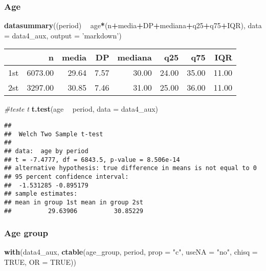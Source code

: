 \documentclass[
]{article}
\newenvironment{Shaded}{\begin{snugshade}}{\end{snugshade}}
\newcommand{\CommentTok}[1]{\textcolor[rgb]{0.56,0.35,0.01}{\textit{#1}}}
\newcommand{\DataTypeTok}[1]{\textcolor[rgb]{0.13,0.29,0.53}{#1}}
\newcommand{\KeywordTok}[1]{\textcolor[rgb]{0.13,0.29,0.53}{\textbf{#1}}}
\newcommand{\NormalTok}[1]{#1}
\newcommand{\OperatorTok}[1]{\textcolor[rgb]{0.81,0.36,0.00}{\textbf{#1}}}
\newcommand{\OtherTok}[1]{\textcolor[rgb]{0.56,0.35,0.01}{#1}}
\newcommand{\StringTok}[1]{\textcolor[rgb]{0.31,0.60,0.02}{#1}}
\begin{document}
\hypertarget{age-2}{%
\subsubsection{Age}\label{age-2}}

\begin{Shaded}
\begin{Highlighting}[]
\KeywordTok{datasummary}\NormalTok{((period) }\OperatorTok{~}\StringTok{ }\NormalTok{age}\OperatorTok{*}\NormalTok{(n}\OperatorTok{+}\NormalTok{media}\OperatorTok{+}\NormalTok{DP}\OperatorTok{+}\NormalTok{mediana}\OperatorTok{+}\NormalTok{q25}\OperatorTok{+}\NormalTok{q75}\OperatorTok{+}\NormalTok{IQR),}
            \DataTypeTok{data =}\NormalTok{ data4_aux, }\DataTypeTok{output =} \StringTok{'markdown'}\NormalTok{)}
\end{Highlighting}
\end{Shaded}

\begin{longtable}[]{@{}lrrrrrrr@{}}
\toprule
& n & media & DP & mediana & q25 & q75 & IQR\tabularnewline
\midrule
\endhead
1st & 6073.00 & 29.64 & 7.57 & 30.00 & 24.00 & 35.00 &
11.00\tabularnewline
2st & 3297.00 & 30.85 & 7.46 & 31.00 & 25.00 & 36.00 &
11.00\tabularnewline
\bottomrule
\end{longtable}

\begin{Shaded}
\begin{Highlighting}[]
\CommentTok{#teste t}
\KeywordTok{t.test}\NormalTok{(age }\OperatorTok{~}\StringTok{ }\NormalTok{period, }\DataTypeTok{data =}\NormalTok{ data4_aux)}
\end{Highlighting}
\end{Shaded}

\begin{verbatim}
## 
##  Welch Two Sample t-test
## 
## data:  age by period
## t = -7.4777, df = 6843.5, p-value = 8.506e-14
## alternative hypothesis: true difference in means is not equal to 0
## 95 percent confidence interval:
##  -1.531285 -0.895179
## sample estimates:
## mean in group 1st mean in group 2st 
##          29.63906          30.85229
\end{verbatim}

\hypertarget{age-group-2}{%
\subsubsection{Age group}\label{age-group-2}}

\begin{Shaded}
\begin{Highlighting}[]
\KeywordTok{with}\NormalTok{(data4_aux, }\KeywordTok{ctable}\NormalTok{(age_group, period, }\DataTypeTok{prop =} \StringTok{"c"}\NormalTok{, }\DataTypeTok{useNA =} \StringTok{"no"}\NormalTok{, }\DataTypeTok{chisq =} \OtherTok{TRUE}\NormalTok{, }\DataTypeTok{OR =} \OtherTok{TRUE}\NormalTok{))}
\end{Highlighting}
\end{Shaded}
\end{document}
